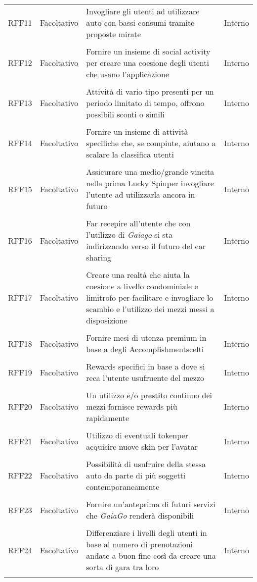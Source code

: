 \begin{longtable}{ >{\centering}p{} >{\centering}p{}
		>{\raggedright}p{} >{\centering}p{}}
	RFF11	&	Facoltativo	&	Invogliare gli utenti ad utilizzare auto con bassi consumi tramite proposte mirate &	Interno  \\ 	\tabularnewline
	RFF12	&	Facoltativo	&	Fornire un insieme di social activity per creare una coesione degli utenti che usano l'applicazione &	Interno  \\ 	\tabularnewline
	RFF13	&	Facoltativo	&	Attività di vario tipo presenti per un periodo limitato di tempo, offrono possibili sconti o simili &	Interno  \\	\tabularnewline
	RFF14	&	Facoltativo	& Fornire un insieme di attività specifiche che, se compiute, aiutano a scalare la classifica utenti &	Interno  \\ 	\tabularnewline
	RFF15	&	Facoltativo	& Assicurare una medio/grande vincita nella prima Lucky Spin\glosp per invogliare l'utente ad utilizzarla ancora in futuro &	Interno  \\ 	\tabularnewline
	RFF16	&	Facoltativo	& Far recepire all'utente che con l'utilizzo di \textit{Gaiago} si sta indirizzando verso il futuro del car sharing &	Interno  \\ 	\tabularnewline
	RFF17	&	Facoltativo	& Creare una realtà che aiuta la coesione a livello condominiale e limitrofo per facilitare e invogliare lo scambio e l'utilizzo dei mezzi messi a disposizione &	Interno  \\ 	\tabularnewline
	RFF18	&	Facoltativo	& Fornire mesi di utenza premium in base a degli Accomplishment\glosp scelti &	Interno  \\ 	\tabularnewline
	RFF19	&	Facoltativo	& Rewards specifici in base a dove si reca l'utente usufruente del mezzo &	Interno  \\ 	\tabularnewline
	RFF20	&	Facoltativo	& Un utilizzo e/o prestito continuo dei mezzi fornisce rewards più rapidamente &	Interno  \\ 	\tabularnewline
	RFF21	&	Facoltativo	& Utilizzo di eventuali token\glosp per acquisire nuove skin per l'avatar  &	Interno  \\ 	\tabularnewline
	RFF22	&	Facoltativo	& Possibilità di usufruire della stessa auto da parte di più soggetti contemporaneamente  &	Interno  \\ 	\tabularnewline
	RFF23	&	Facoltativo	& Fornire un'anteprima di futuri servizi che \textit{GaiaGo} renderà disponibili  &	Interno  \\ 	\tabularnewline
	RFF24	&	Facoltativo	& Differenziare i livelli degli utenti in base al numero di prenotazioni andate a buon fine così da creare una sorta di gara tra loro  &	Interno  \\ 	\tabularnewline

\end{longtable}
